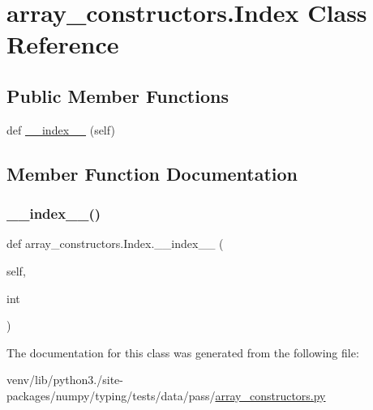 \hypertarget{classarray__constructors_1_1Index}{}\section{array\+\_\+constructors.\+Index Class Reference}
\label{classarray__constructors_1_1Index}
\subsection*{Public Member Functions}
\begin{DoxyCompactItemize}
\item 
def \hyperlink{classarray__constructors_1_1Index_ac6b6732ed726947744e55a2831cea249}{\+\_\+\+\_\+index\+\_\+\+\_\+} (self)
\end{DoxyCompactItemize}


\subsection{Member Function Documentation}
\mbox{\label{classarray__constructors_1_1Index_ac6b6732ed726947744e55a2831cea249}} 
\subsubsection{\texorpdfstring{\+\_\+\+\_\+index\+\_\+\+\_\+()}{\_\_index\_\_()}}
{\footnotesize\ttfamily def array\+\_\+constructors.\+Index.\+\_\+\+\_\+index\+\_\+\+\_\+ (\begin{DoxyParamCaption}\item[{}]{self,  }\item[{}]{int }\end{DoxyParamCaption})}



The documentation for this class was generated from the following file\+:\begin{DoxyCompactItemize}
\item 
venv/lib/python3./site-\/packages/numpy/typing/tests/data/pass/\hyperlink{pass_2array__constructors_8py}{array\+\_\+constructors.\+py}\end{DoxyCompactItemize}
